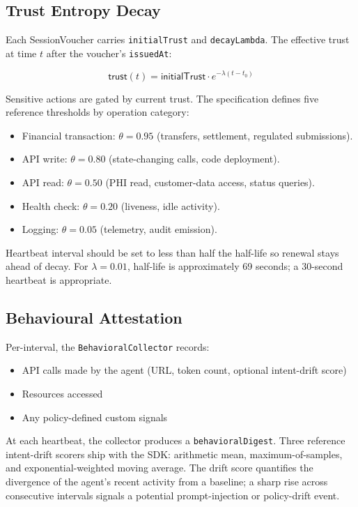 \documentclass[11pt,a4paper]{article}
\begin{document}
\subsection{Trust Entropy Decay}

Each SessionVoucher carries \texttt{initialTrust} and \texttt{decayLambda}. The effective trust at time $t$ after the voucher's \texttt{issuedAt}:

\[
\textsf{trust}(t) = \textsf{initialTrust} \cdot e^{-\lambda (t - t_0)}
\]

Sensitive actions are gated by current trust. The specification defines five reference thresholds by operation category:

\begin{itemize}[leftmargin=*]
\item Financial transaction: $\theta = 0.95$ (transfers, settlement, regulated submissions).
\item API write: $\theta = 0.80$ (state-changing calls, code deployment).
\item API read: $\theta = 0.50$ (PHI read, customer-data access, status queries).
\item Health check: $\theta = 0.20$ (liveness, idle activity).
\item Logging: $\theta = 0.05$ (telemetry, audit emission).
\end{itemize}

Heartbeat interval should be set to less than half the half-life so renewal stays ahead of decay. For $\lambda = 0.01$, half-life is approximately 69 seconds; a 30-second heartbeat is appropriate.

\subsection{Behavioural Attestation}

Per-interval, the \verb|BehavioralCollector| records:

\begin{itemize}[leftmargin=*]
\item API calls made by the agent (URL, token count, optional intent-drift score)
\item Resources accessed
\item Any policy-defined custom signals
\end{itemize}

At each heartbeat, the collector produces a \verb|behavioralDigest|. Three reference intent-drift scorers ship with the SDK: arithmetic mean, maximum-of-samples, and exponential-weighted moving average. The drift score quantifies the divergence of the agent's recent activity from a baseline; a sharp rise across consecutive intervals signals a potential prompt-injection or policy-drift event.
\end{document}
